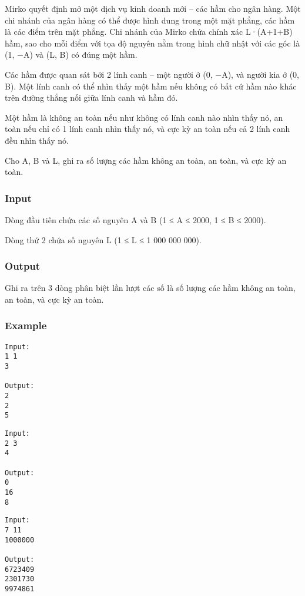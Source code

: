 



   Mirko quyết định mở một dịch vụ kinh doanh mới – các hầm cho ngân hàng. Một chi nhánh của ngân hàng có thể được hình dung trong một mặt phẳng, các hầm là các điểm trên mặt phẳng. Chi nhánh của Mirko chứa chính xác L·(A+1+B) hầm, sao cho mỗi điểm với tọa độ nguyên nằm trong hình chữ nhật với các góc là (1, −A) và (L, B) có đúng một hầm.  

   Các hầm được quan sát bởi 2 lính canh – một người ở (0, −A),  và người kia ở (0, B). Một lính canh có thể nhìn thấy một hầm nếu không có bất cứ hầm nào khác trên đường thẳng nối giữa lính canh và hầm đó.  

   Một hầm là không an toàn nếu như không có lính canh nào nhìn thấy nó, an toàn nếu chỉ có 1 lính canh nhìn thấy nó, và cực kỳ an toàn nếu cả 2 lính canh đều nhìn thấy nó.  

   Cho A, B và L, ghi ra số lượng các hầm không an toàn, an toàn, và cực kỳ an toàn.  

\subsubsection{   Input  }

   Dòng đầu tiên chứa các số nguyên A và B (1 ≤ A ≤ 2000, 1 ≤ B ≤ 2000).  

   Dòng thứ 2 chứa số nguyên L (1 ≤ L ≤ 1 000 000 000).  

\subsubsection{   Output  }

   Ghi ra trên 3 dòng phân biệt lần lượt các số là số lượng các hầm không an toàn, an toàn, và cực kỳ an toàn.  

\subsubsection{   Example  }
\begin{verbatim}
Input:
1 1
3

Output:
2
2
5
\end{verbatim}
\begin{verbatim}
Input:
2 3
4

Output:
0
16
8
\end{verbatim}
\begin{verbatim}
Input:
7 11
1000000

Output:
6723409
2301730
9974861
\end{verbatim}
